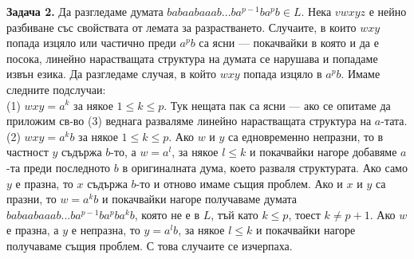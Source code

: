 \documentclass{article}
\begin{document}
    \vspace{15pt}

    \textbf{Задача 2.} Да разгледаме думата $babaabaaab...ba^{p-1}ba^pb \in L$. Нека
    $vwxyz$ е нейно разбиване със свойствата от лемата за разрастването. Случаите, в
    които $wxy$ попада изцяло или частично преди $a^pb$ са ясни — покачвайки в която
    и да е посока, линейно нарастващата структура на думата се нарушава и попадаме 
    извън езика. Да разгледаме случая, в който $wxy$ попада изцяло в $a^pb$. Имаме
    следните подслучаи: \\
    (1) $wxy = a^k$ за някое $1 \leq k \leq p$. Тук нещата пак са ясни — ако се опитаме
    да приложим св-во (3) веднага разваляме линейно нарастващата структура на $a$-тата. \\
    (2) $wxy = a^kb$ за някое $1 \leq k \leq p$. Ако $w$ и $y$ са едновременно 
    непразни, то в частност $y$ съдържа $b$-то, а $w = a^l$, за някое $l \leq k$ и покачвайки нагоре добавяме $a$-та преди
    последното $b$ в оригиналната дума, което разваля структурата. Ако само $y$ е празна,
    то $x$ съдържа $b$-то и отново имаме същия проблем. Ако и $x$ и $y$ са празни,
    то $w = a^kb$ и покачвайки нагоре получаваме думата $babaabaaab...ba^{p-1}ba^pba^kb$,
    която не е в $L$, тъй като $k \leq p$, тоест $k \neq p+1$. Ако $w$ е празна, а 
    $y$ е непразна, то $y = a^lb$, за някое $l \leq k$ и покачвайки нагоре получаваме
    същия проблем. С това случаите се изчерпаха.

    \vspace{15pt}
\end{document}
